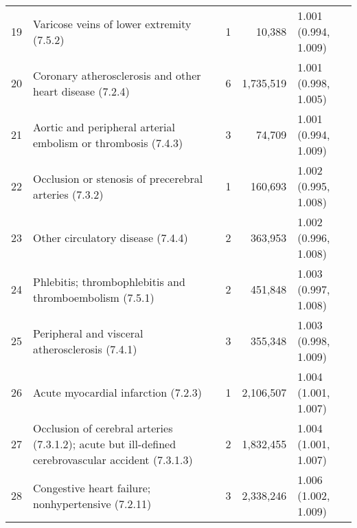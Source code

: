\begin{tabular}{lp{6.5cm}rrp{2.2cm}}
    19 & Varicose veins of lower extremity (7.5.2) &    1 & 10,388 & 1.001 (0.994, 1.009) \\ 
    20 & Coronary atherosclerosis and other heart disease (7.2.4) &    6 & 1,735,519 & 1.001 (0.998, 1.005) \\ 
    21 & Aortic and peripheral arterial embolism or thrombosis (7.4.3) &    3 & 74,709 & 1.001 (0.994, 1.009) \\ 
    22 & Occlusion or stenosis of precerebral arteries (7.3.2) &    1 & 160,693 & 1.002 (0.995, 1.008) \\ 
    23 & Other circulatory disease (7.4.4) &    2 & 363,953 & 1.002 (0.996, 1.008) \\ 
    24 & Phlebitis; thrombophlebitis and thromboembolism (7.5.1) &    2 & 451,848 & 1.003 (0.997, 1.008) \\ 
    25 & Peripheral and visceral atherosclerosis (7.4.1) &    3 & 355,348 & 1.003 (0.998, 1.009) \\ 
    26 & Acute myocardial infarction (7.2.3) &    1 & 2,106,507 & 1.004 (1.001, 1.007) \\ 
    27 & Occlusion of cerebral arteries (7.3.1.2); acute but ill-defined cerebrovascular accident (7.3.1.3) &    2 & 1,832,455 & 1.004 (1.001, 1.007) \\ 
    28 & Congestive heart failure; nonhypertensive (7.2.11) &    3 & 2,338,246 & 1.006 (1.002, 1.009) \\ 
   \hline
\end{tabular}

